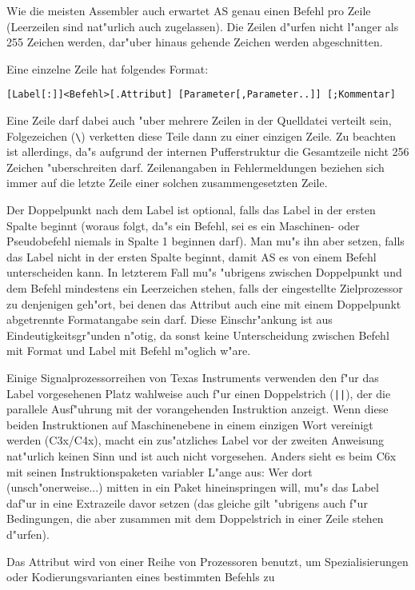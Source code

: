 \documentclass[12pt,a4paper,twoside]{report}
\begin{document}
Wie die meisten Assembler auch erwartet AS genau einen Befehl pro Zeile
(Leerzeilen sind nat"urlich auch zugelassen).  Die Zeilen d"urfen nicht
l"anger als 255 Zeichen werden, dar"uber hinaus gehende Zeichen werden
abgeschnitten.
\par
Eine einzelne Zeile hat folgendes Format:
\begin{verbatim}
[Label[:]]<Befehl>[.Attribut] [Parameter[,Parameter..]] [;Kommentar]
\end{verbatim}
Eine Zeile darf dabei auch "uber mehrere Zeilen in der Quelldatei
verteilt sein, Folgezeichen (\verb!\!) verketten diese Teile dann zu
einer einzigen Zeile.  Zu beachten ist allerdings, da"s aufgrund der 
internen Pufferstruktur die Gesamtzeile nicht 256 Zeichen "uberschreiten
darf.  Zeilenangaben in Fehlermeldungen beziehen sich immer auf die
letzte Zeile einer solchen zusammengesetzten Zeile.
\par
Der Doppelpunkt nach dem Label ist optional, falls das Label in der
ersten Spalte beginnt (woraus folgt, da"s ein Befehl, sei es ein
Maschinen- oder Pseudobefehl niemals in Spalte 1 beginnen darf).
Man mu"s ihn aber setzen, falls das Label nicht in der ersten Spalte
beginnt, damit AS es von einem Befehl unterscheiden kann.  In letzterem
Fall mu"s "ubrigens zwischen Doppelpunkt und dem Befehl mindestens ein
Leerzeichen stehen, falls der eingestellte Zielprozessor zu denjenigen
geh"ort, bei denen das Attribut auch eine mit einem Doppelpunkt
abgetrennte Formatangabe sein darf.  Diese Einschr"ankung ist aus
Eindeutigkeitsgr"unden n"otig, da sonst keine Unterscheidung zwischen
Befehl mit Format und Label mit Befehl m"oglich w"are.
\par
Einige Signalprozessorreihen von Texas Instruments verwenden den f"ur das
Label vorgesehenen Platz wahlweise auch f"ur einen Doppelstrich
(\verb!||!), der die parallele Ausf"uhrung mit der vorangehenden
Instruktion anzeigt.  Wenn diese beiden Instruktionen auf Maschinenebene
in einem einzigen Wort vereinigt werden (C3x/C4x), macht ein zus"atzliches
Label vor der zweiten Anweisung nat"urlich keinen Sinn und ist auch nicht
vorgesehen.  Anders sieht es beim C6x mit seinen Instruktionspaketen
variabler L"ange aus: Wer dort (unsch"onerweise...) mitten in ein Paket
hineinspringen will, mu"s das Label daf"ur in eine Extrazeile davor setzen
(das gleiche gilt "ubrigens auch f"ur Bedingungen, die aber zusammen mit
dem Doppelstrich in einer Zeile stehen d"urfen).
\par
Das Attribut wird von einer Reihe von Prozessoren benutzt, um
Spezialisierungen oder Kodierungsvarianten eines bestimmten Befehls zu
\end{document}
